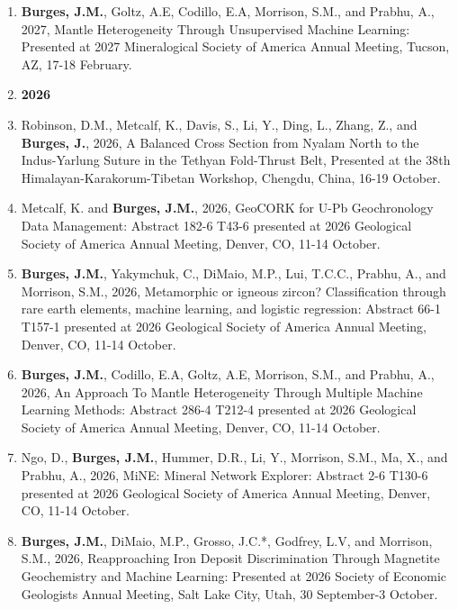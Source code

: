 \documentclass{res} %
\begin{document}
\begin{resume}
\begin{enumerate}
\item \textbf{Burges, J.M.}, Goltz, A.E, Codillo, E.A, Morrison, S.M., and Prabhu, A., 2027, Mantle Heterogeneity Through Unsupervised Machine Learning: Presented at 2027 Mineralogical Society of America Annual Meeting, Tucson, AZ, 17-18 February.


\item[] \hspace*{-24pt}\textbf{\large 2026}

\item Robinson, D.M., Metcalf, K., Davis, S., Li, Y., Ding, L., Zhang, Z., and \textbf{Burges, J.}, 2026, A Balanced Cross Section from Nyalam North to the Indus-Yarlung Suture in the Tethyan Fold-Thrust Belt, Presented at the 38th Himalayan-Karakorum-Tibetan Workshop, Chengdu, China, 16-19 October.

\item Metcalf, K. and \textbf{Burges, J.M.}, 2026, GeoCORK for U-Pb Geochronology Data Management: Abstract 182-6 T43-6 presented at 2026 Geological Society of America Annual Meeting, Denver, CO, 11-14 October.

\item \textbf{Burges, J.M.}, Yakymchuk, C., DiMaio, M.P., Lui, T.C.C., Prabhu, A., and Morrison, S.M., 2026, Metamorphic or igneous zircon? Classification through rare earth elements, machine learning, and logistic regression: Abstract 66-1 T157-1 presented at 2026 Geological Society of America Annual Meeting, Denver, CO, 11-14 October.

\item \textbf{Burges, J.M.}, Codillo, E.A, Goltz, A.E, Morrison, S.M., and Prabhu, A., 2026, An Approach To Mantle Heterogeneity Through Multiple Machine Learning Methods: Abstract 286-4 T212-4 presented at 2026 Geological Society of America Annual Meeting, Denver, CO, 11-14 October.

\item Ngo, D., \textbf{Burges, J.M.}, Hummer, D.R., Li, Y., Morrison, S.M., Ma, X., and Prabhu, A., 2026, MiNE: Mineral Network Explorer: Abstract 2-6 T130-6 presented at 2026 Geological Society of America Annual Meeting, Denver, CO, 11-14 October.

\item \textbf{Burges, J.M.}, DiMaio, M.P., Grosso, J.C.*, Godfrey, L.V, and Morrison, S.M., 2026, Reapproaching Iron Deposit Discrimination Through Magnetite Geochemistry and Machine Learning: Presented at 2026 Society of Economic Geologists Annual Meeting, Salt Lake City, Utah, 30 September-3 October.


\end{enumerate}
\end{resume}
\end{document}
